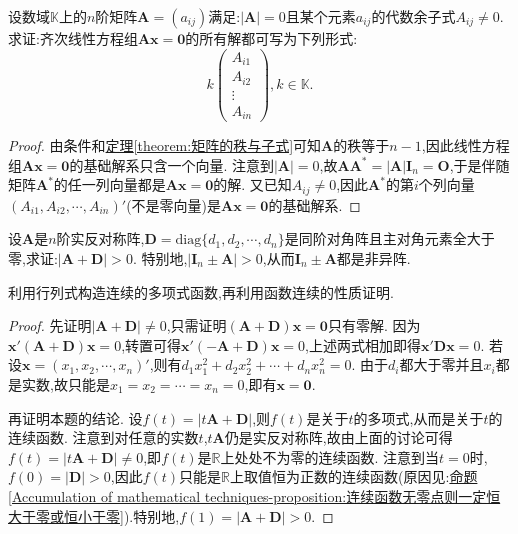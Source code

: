 \documentclass[lang=cn,newtx,10pt,scheme=chinese]{elegantbook}
\begin{document}
\begin{proposition}\label{proposition:奇异系数矩阵Ax=0的解空间}
设数域\(\mathbb{K}\)上的\(n\)阶矩阵\(\boldsymbol{A}=(a_{ij})\)满足:\(|\boldsymbol{A}| = 0\)且某个元素\(a_{ij}\)的代数余子式\(A_{ij}\neq0\). 求证:齐次线性方程组\(\boldsymbol{A}\boldsymbol{x}=\boldsymbol{0}\)的所有解都可写为下列形式:
\[
k\begin{pmatrix}
A_{i1}\\
A_{i2}\\
\vdots\\
A_{in}
\end{pmatrix},k\in\mathbb{K}.
\]
\end{proposition}
\begin{proof}
    由条件和\hyperref[theorem:矩阵的秩与子式]{定理\ref{theorem:矩阵的秩与子式}}可知\(\boldsymbol{A}\)的秩等于\(n - 1\),因此线性方程组\(\boldsymbol{A}\boldsymbol{x}=\boldsymbol{0}\)的基础解系只含一个向量. 注意到\(|\boldsymbol{A}| = 0\),故\(\boldsymbol{A}\boldsymbol{A}^*=|\boldsymbol{A}|\boldsymbol{I}_n=\boldsymbol{O}\),于是伴随矩阵\(\boldsymbol{A}^*\)的任一列向量都是\(\boldsymbol{A}\boldsymbol{x}=\boldsymbol{0}\)的解. 又已知\(A_{ij}\neq0\),因此\(\boldsymbol{A}^*\)的第\(i\)个列向量\((A_{i1},A_{i2},\cdots,A_{in})'\)(不是零向量)是\(\boldsymbol{A}\boldsymbol{x}=\boldsymbol{0}\)的基础解系.   
\end{proof}

\begin{example}
设\(\boldsymbol{A}\)是\(n\)阶实反对称阵,\(\boldsymbol{D}=\mathrm{diag}\{d_1,d_2,\cdots,d_n\}\)是同阶对角阵且主对角元素全大于零,求证:\(|\boldsymbol{A}+\boldsymbol{D}|>0\). 特别地,\(|\boldsymbol{I}_n\pm\boldsymbol{A}|>0\),从而\(\boldsymbol{I}_n\pm\boldsymbol{A}\)都是非异阵.
\end{example}
\begin{note}
    利用行列式构造连续的多项式函数,再利用函数连续的性质证明.
\end{note}
\begin{proof}
先证明\(|\boldsymbol{A}+\boldsymbol{D}|\neq0\),只需证明\((\boldsymbol{A}+\boldsymbol{D})\boldsymbol{x}=\boldsymbol{0}\)只有零解. 因为\(\boldsymbol{x}'(\boldsymbol{A}+\boldsymbol{D})\boldsymbol{x}=0\),转置可得\(\boldsymbol{x}'(-\boldsymbol{A}+\boldsymbol{D})\boldsymbol{x}=0\),上述两式相加即得\(\boldsymbol{x}'\boldsymbol{D}\boldsymbol{x}=0\). 若设\(\boldsymbol{x}=(x_1,x_2,\cdots,x_n)'\),则有\(d_1x_1^2 + d_2x_2^2+\cdots + d_nx_n^2 = 0\). 由于\(d_i\)都大于零并且\(x_i\)都是实数,故只能是\(x_1 = x_2=\cdots = x_n = 0\),即有\(\boldsymbol{x}=\boldsymbol{0}\).

再证明本题的结论. 设\(f(t)=|t\boldsymbol{A}+\boldsymbol{D}|\),则\(f(t)\)是关于\(t\)的多项式,从而是关于\(t\)的连续函数. 注意到对任意的实数\(t\),\(t\boldsymbol{A}\)仍是实反对称阵,故由上面的讨论可得\(f(t)=|t\boldsymbol{A}+\boldsymbol{D}|\neq0\),即\(f(t)\)是\(\mathbb{R}\)上处处不为零的连续函数. 注意到当\(t = 0\)时,\(f(0)=|\boldsymbol{D}|>0\),因此\(f(t)\)只能是\(\mathbb{R}\)上取值恒为正数的连续函数(原因见:\hyperref[Accumulation of mathematical techniques-proposition:连续函数无零点则一定恒大于零或恒小于零]{命题\ref{Accumulation of mathematical techniques-proposition:连续函数无零点则一定恒大于零或恒小于零}}).特别地,\(f(1)=|\boldsymbol{A}+\boldsymbol{D}|>0\). 
\end{proof}
\end{document}
